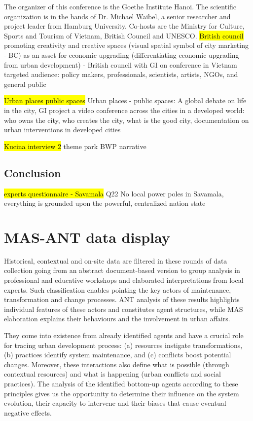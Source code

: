 \documentclass[11pt]{report}
\begin{document}
The organizer of this conference is the Goethe Institute Hanoi. The scientific organization is in the hands of Dr. Michael Waibel, a senior researcher and project leader from Hamburg University. Co-hosts are the Ministry for Culture, Sports and Tourism of Vietnam, British Council and UNESCO.
\hl{British council}
promoting creativity and creative spaces (visual spatial symbol of city marketing - BC) as an asset for economic upgrading (differentiating economic upgrading from urban development) - British council with GI on conference in Vietnam
targeted audience: policy makers, professionals, scientists, artists, NGOs, and general public

\hl{Urban places public spaces}
Urban places - public spaces: A global debate on life in the city, GI project a video conference across the cities in a developed world: who owns the city, who creates the city, what is the good city, documentation on urban interventions in developed cities

\hl{Kucina interview 2}
theme park BWP narrative

\section{Conclusion}
\hl{experts questionnaire - Savamala}
Q22
No local power poles in Savamala, everything is grounded upon the powerful, centralized nation state

\chapter{MAS-ANT data display}

Historical, contextual and on-site data are filtered in these rounds of data collection going from an abstract document-based version to group analysis in professional and educative workshops and elaborated interpretations from local experts. Such classification enables pointing the key actors of maintenance, transformation and change processes. ANT analysis of these results highlights individual features of these actors and constitutes agent structures, while MAS elaboration explains their behaviours and the involvement in urban affairs.

They come into existence from already identified agents and have a crucial role for tracing urban development process: (a) resources instigate transformations, (b) practices identify system maintenance, and (c) conflicts boost potential changes. Moreover, these interactions also define what is possible (through contextual resources) and what is happening (urban conflicts and social practices). The analysis of the identified bottom-up agents according to these principles gives us the opportunity to determine their influence on the system evolution, their capacity to intervene and their biases that cause eventual negative effects.
\end{document}
